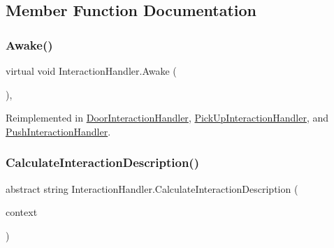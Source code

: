 \subsection{Member Function Documentation}
\mbox{\label{class_interaction_handler_adbbb312d562d3060de296f6da5c97631}} 
\subsubsection{\texorpdfstring{Awake()}{Awake()}}
{\footnotesize\ttfamily virtual void Interaction\+Handler.\+Awake (\begin{DoxyParamCaption}{ }\end{DoxyParamCaption})\hspace{0.3cm}{\ttfamily [protected]}, {\ttfamily [virtual]}}



Reimplemented in \mbox{\hyperlink{class_door_interaction_handler_ae1d36b6037ec736fed8b528e5125f1be}{Door\+Interaction\+Handler}}, \mbox{\hyperlink{class_pick_up_interaction_handler_a679468740f0c76cf96acef5315bccb6d}{Pick\+Up\+Interaction\+Handler}}, and \mbox{\hyperlink{class_push_interaction_handler_a5e962d17b817f70e1376ca9f3091c326}{Push\+Interaction\+Handler}}.

\mbox{\label{class_interaction_handler_acdd154cb8b276e122915412b3b7274d3}} 
\subsubsection{\texorpdfstring{Calculate\+Interaction\+Description()}{CalculateInteractionDescription()}}
{\footnotesize\ttfamily abstract string Interaction\+Handler.\+Calculate\+Interaction\+Description (\begin{DoxyParamCaption}\item[{\mbox{\hyperlink{class_interaction_context}{Interaction\+Context}}}]{context }\end{DoxyParamCaption})\hspace{0.3cm}{\ttfamily [pure virtual]}}



